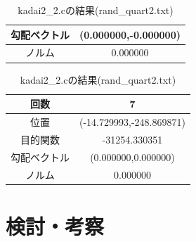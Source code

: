 \documentclass[12pt]{jarticle}
\begin{document}
\begin{table}[h]
\begin{center}
\begin{tabular}{|c|c|}
        勾配ベクトル&(0.000000,-0.000000)\\
        \hline
        ノルム&0.000000\\
        \hline
    \end{tabular}
    \caption{kadai2\_2.cの結果(rand\_quart2.txt)}
        \begin{tabular}{|c|c|}
            \hline
            回数&7\\
            \hline
            位置&(-14.729993,-248.869871)\\
            \hline
            目的関数&-31254.330351\\
            \hline
            勾配ベクトル&(0.000000,0.000000)\\
            \hline
            ノルム&0.000000\\
            \hline
        \end{tabular}
    \end{center}
\end{table}
\section{検討・考察}
\end{document}
